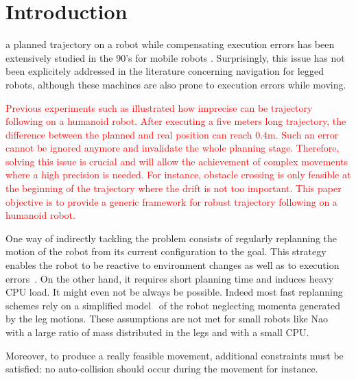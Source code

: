 \section{Introduction}

 a planned trajectory on a robot while
compensating execution errors has been extensively studied in the 90's
for mobile robots \cite{91icra.samson,
  98deLucaOrioloSamson}. Surprisingly, this issue has not been
explicitely addressed in the literature concerning navigation for
legged robots, although these machines are also prone to execution
errors while moving.

\textcolor{red}{Previous experiments such as
  \cite{11humanoids.baudouin} illustrated how imprecise can be
  trajectory following on a humanoid robot. After executing a five
  meters long trajectory, the difference between the planned and real
  position can reach $0.4 \textrm{m}$. Such an error cannot be ignored
  anymore and invalidate the whole planning stage. Therefore, solving
  this issue is crucial and will allow the achievement of complex
  movements where a high precision is needed. For instance, obstacle
  crossing is only feasible at the beginning of the trajectory where
  the drift is not too important. This paper objective is to provide a
  generic framework for robust trajectory following on a humanoid
  robot.  }

One way of indirectly tackling the problem consists of regularly
replanning the motion of the robot from its current configuration to
the goal. This strategy enables the robot to be reactive to
environment changes as well as to execution
errors~\cite{05humanoids.michel,
  06icra.MichelChestnut,10springer.chestnut}. On the other hand, it
requires short planning time and induces heavy CPU load. It might even
not be always be possible. Indeed most fast replanning schemes rely on
a simplified model~\cite{01icra.KajitaKanehiro} of the robot
neglecting momenta generated by the leg motions. These assumptions are
not met for small robots like Nao~\cite{wikipedia.nao} with a large
ratio of mass distributed in the legs and with a small CPU.

Moreover, to produce a really feasible movement, additional
constraints must be satisfied: no auto-collision should occur during
the movement for instance.


